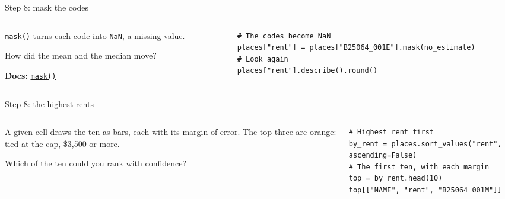 \documentclass[9pt,aspectratio=169]{beamer}
\begin{document}
\begin{frame}[fragile]{Step 8: mask the codes}
    \begin{columns}[T]
        \begin{column}{0.37\textwidth}
            \texttt{mask()} turns each code into \texttt{NaN}, a missing value.

            \medskip
            How did the mean and the median move?

            \medskip
            {\scriptsize\textbf{Docs:} \href{https://pandas.pydata.org/docs/reference/api/pandas.Series.mask.html}{\texttt{mask()}}\par}
        \end{column}
        \begin{column}{0.6\textwidth}
\begin{lstlisting}
# The codes become NaN
places["rent"] = places["B25064_001E"].mask(no_estimate)
# Look again
places["rent"].describe().round()
\end{lstlisting}
        \end{column}
    \end{columns}
\end{frame}

\begin{frame}[fragile]{Step 8: the highest rents}
    \begin{columns}[T]
        \begin{column}{0.37\textwidth}
            A given cell draws the ten as bars, each with its margin of error. The top three are orange: tied at the cap, \$3,500 or more.

            \medskip
            Which of the ten could you rank with confidence?
        \end{column}
        \begin{column}{0.6\textwidth}
\begin{lstlisting}
# Highest rent first
by_rent = places.sort_values("rent", ascending=False)
# The first ten, with each margin
top = by_rent.head(10)
top[["NAME", "rent", "B25064_001M"]]
\end{lstlisting}
        \end{column}
    \end{columns}
\end{frame}
\end{document}
